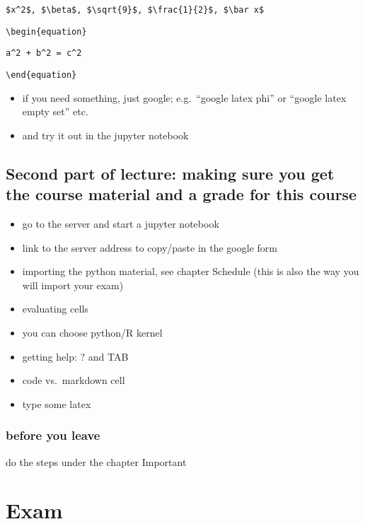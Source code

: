 \documentclass[]{book}
\providecommand{\tightlist}{%
  \setlength{\itemsep}{0pt}\setlength{\parskip}{0pt}}
\begin{document}
\texttt{\$x\^{}2\$,\ \$\textbackslash{}beta\$,\ \$\textbackslash{}sqrt\{9\}\$,\ \$\textbackslash{}frac\{1\}\{2\}\$,\ \$\textbackslash{}bar\ x\$}

\texttt{\textbackslash{}begin\{equation\}}

\texttt{a\^{}2\ +\ b\^{}2\ =\ c\^{}2}

\texttt{\textbackslash{}end\{equation\}}

\begin{itemize}
\tightlist
\item
  if you need something, just google; e.g.~``google latex phi'' or ``google latex empty set'' etc.
\item
  and try it out in the jupyter notebook
\end{itemize}

\hypertarget{second-part-of-lecture-making-sure-you-get-the-course-material-and-a-grade-for-this-course}{%
\section{Second part of lecture: making sure you get the course material and a grade for this course}\label{second-part-of-lecture-making-sure-you-get-the-course-material-and-a-grade-for-this-course}}

\begin{itemize}
\tightlist
\item
  go to the server and start a jupyter notebook
\item
  link to the server address to copy/paste in the google form
\item
  importing the python material, see chapter Schedule (this is also the way you will import your exam)
\item
  evaluating cells
\item
  you can choose python/R kernel
\item
  getting help: ? and TAB
\item
  code vs.~markdown cell
\item
  type some latex
\end{itemize}

\hypertarget{before-you-leave}{%
\subsection{before you leave}\label{before-you-leave}}

do the steps under the chapter Important

\hypertarget{exam-1}{%
\chapter{Exam}\label{exam-1}}
\end{document}
